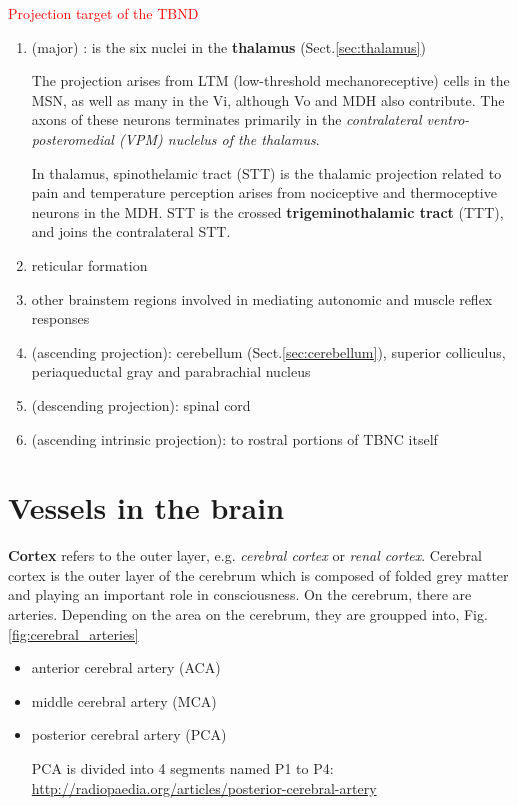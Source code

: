 \textcolor{red}{Projection target of the TBND} 
\begin{enumerate}
  \item (major) : is the six nuclei in the {\bf thalamus}
  (Sect.\ref{sec:thalamus})

The projection arises from LTM (low-threshold mechanoreceptive) cells in the
MSN, as well as many in the Vi, although Vo and MDH also contribute.
The axons of these neurons terminates primarily in the {\it contralateral
ventro-posteromedial (VPM) nuclelus of the thalamus}.

In thalamus, spinothelamic tract (STT) is the thalamic projection related to
pain and temperature perception arises from nociceptive and thermoceptive
neurons in the MDH.  STT is the crossed {\bf trigeminothalamic tract} (TTT), and
joins the contralateral STT.

  \item reticular formation
  
  \item other brainstem regions involved in mediating autonomic and muscle
  reflex responses
  
  \item (ascending projection): cerebellum (Sect.\ref{sec:cerebellum}), superior 
  colliculus, periaqueductal gray and parabrachial nucleus
  
  \item (descending projection): spinal cord
  
  \item (ascending intrinsic projection): to rostral portions of TBNC itself
\end{enumerate}


\section{Vessels in the brain}

{\bf Cortex} refers to the outer layer, e.g. {\it cerebral cortex} or {\it
renal cortex}. Cerebral cortex  is the outer layer of the cerebrum
which is composed of folded grey matter and playing an important role in
consciousness. On the cerebrum, there are arteries. Depending on the area on the
cerebrum, they are groupped into, Fig.\ref{fig:cerebral_arteries}
\begin{itemize}
  \item anterior cerebral artery (ACA)
  \item middle cerebral artery (MCA)
  \item posterior cerebral artery (PCA)

  PCA is divided into 4 segments named P1 to P4:
  \url{http://radiopaedia.org/articles/posterior-cerebral-artery}
\end{itemize}

